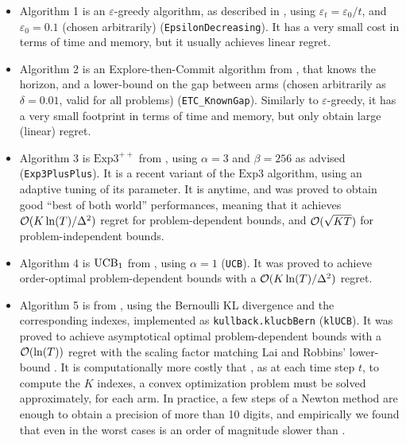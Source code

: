 
\begin{itemize}
    \item Algorithm 1 is
    an $\varepsilon$-greedy algorithm, as described in \cite{Bubeck12}, using $\varepsilon_t = \varepsilon_0 / t$, and $\varepsilon_0 = 0.1$ (chosen arbitrarily) (\texttt{EpsilonDecreasing}).
    It has a very small cost in terms of time and memory, but it usually achieves linear regret.

    \item Algorithm 2 is
    an Explore-then-Commit algorithm from \cite{GarivierETC2016}, that knows the horizon, and a lower-bound on the gap between arms (chosen arbitrarily as $\delta=0.01$, valid for all problems) (\texttt{ETC\_KnownGap}).
    Similarly to $\varepsilon$-greedy, it has a very small footprint in terms of time and memory, but only obtain large (linear) regret.

    \item Algorithm 3 is
    $\mathrm{Exp}3^{++}$ from \cite{Seldin17}, using $\alpha=3$ and $\beta=256$ as advised (\texttt{Exp3PlusPlus}).
    It is a recent variant of the $\mathrm{Exp3}$ algorithm, using an adaptive tuning of its parameter. It is anytime, and was proved to obtain good ``best of both world'' performances, meaning that it achieves $\mathcal{O}(K\ln(T)/\Delta^2)$ regret for problem-dependent bounds, and $\mathcal{O}(\sqrt{KT})$ for problem-independent bounds.

    \item Algorithm 4 is
    $\mathrm{UCB}_1$ from \cite{Auer02}, using $\alpha=1$ (\texttt{UCB}).
    It was proved to achieve order-optimal problem-dependent bounds with a $\mathcal{O}(K\ln(T)/\Delta^2)$ regret.

    \item Algorithm 5 is
    \klUCB{} from \cite{KLUCBJournal}, using the Bernoulli KL divergence and the corresponding \klUCB{} indexes, implemented as \texttt{kullback.klucbBern} (\texttt{klUCB}).
    It was proved to achieve asymptotical optimal problem-dependent bounds with a $\mathcal{O}(\ln(T))$ regret with the scaling factor matching Lai and Robbins' lower-bound \cite{LaiRobbins85}.
    It is computationally more costly that \UCB, as at each time step $t$, to compute the $K$ indexes, a convex optimization problem must be solved approximately, for each arm.
    In practice, a few steps of a Newton method are enough to obtain a precision of more than 10 digits, and empirically we found that even in the worst cases \klUCB{} is an order of magnitude slower than \UCB.


\end{itemize}
